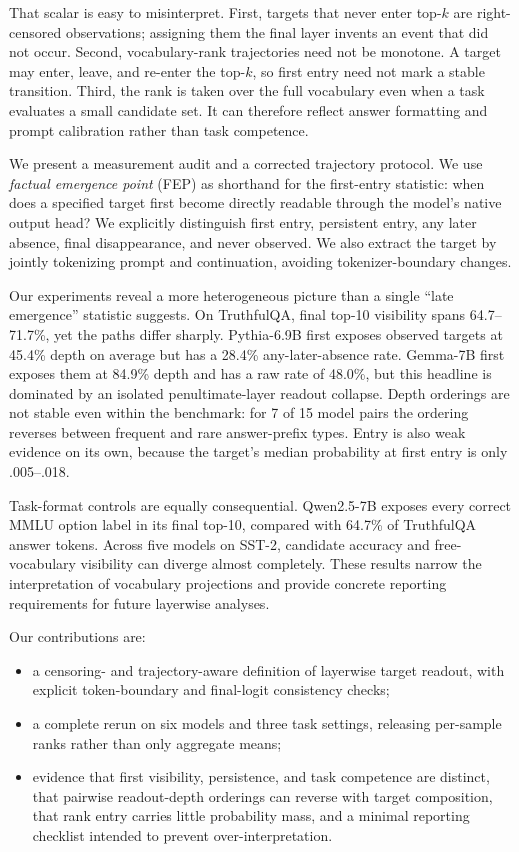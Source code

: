 \documentclass[11pt]{article}
\begin{document}
That scalar is easy to misinterpret. First, targets that never enter top-$k$ are right-censored observations; assigning them the final layer invents an event that did not occur. Second, vocabulary-rank trajectories need not be monotone. A target may enter, leave, and re-enter the top-$k$, so first entry need not mark a stable transition. Third, the rank is taken over the full vocabulary even when a task evaluates a small candidate set. It can therefore reflect answer formatting and prompt calibration rather than task competence.

We present a measurement audit and a corrected trajectory protocol. We use \emph{factual emergence point} (FEP) as shorthand for the first-entry statistic: when does a specified target first become directly readable through the model's native output head? We explicitly distinguish first entry, persistent entry, any later absence, final disappearance, and never observed. We also extract the target by jointly tokenizing prompt and continuation, avoiding tokenizer-boundary changes.

Our experiments reveal a more heterogeneous picture than a single ``late emergence'' statistic suggests. On TruthfulQA, final top-10 visibility spans 64.7--71.7\%, yet the paths differ sharply. Pythia-6.9B first exposes observed targets at 45.4\% depth on average but has a 28.4\% any-later-absence rate. Gemma-7B first exposes them at 84.9\% depth and has a raw rate of 48.0\%, but this headline is dominated by an isolated penultimate-layer readout collapse. Depth orderings are not stable even within the benchmark: for 7 of 15 model pairs the ordering reverses between frequent and rare answer-prefix types. Entry is also weak evidence on its own, because the target's median probability at first entry is only .005--.018.

Task-format controls are equally consequential. Qwen2.5-7B exposes every correct MMLU option label in its final top-10, compared with 64.7\% of TruthfulQA answer tokens. Across five models on SST-2, candidate accuracy and free-vocabulary visibility can diverge almost completely. These results narrow the interpretation of vocabulary projections and provide concrete reporting requirements for future layerwise analyses.

Our contributions are:
\begin{itemize}
    \item a censoring- and trajectory-aware definition of layerwise target readout, with explicit token-boundary and final-logit consistency checks;
    \item a complete rerun on six models and three task settings, releasing per-sample ranks rather than only aggregate means;
    \item evidence that first visibility, persistence, and task competence are distinct, that pairwise readout-depth orderings can reverse with target composition, that rank entry carries little probability mass, and a minimal reporting checklist intended to prevent over-interpretation.
\end{itemize}
\end{document}
